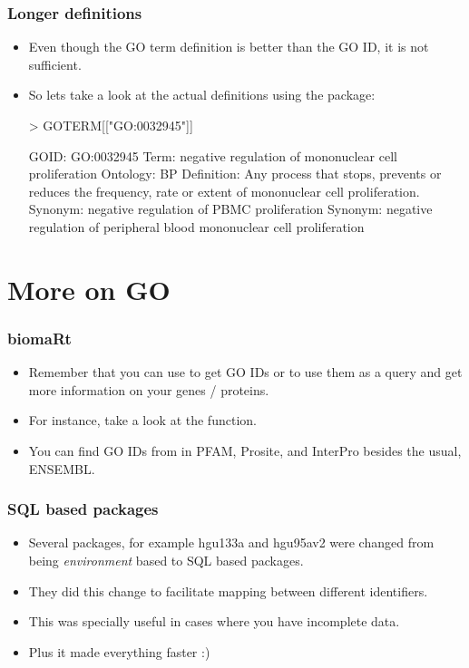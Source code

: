 \begin{frame}
  \frametitle{Longer definitions}
  \begin{itemize}
  \item Even though the GO term definition is better than the GO ID, it is not sufficient.
  \item So lets take a look at the actual definitions using the  package:
\begin{Schunk}
\begin{Sinput}
> GOTERM[["GO:0032945"]]
\end{Sinput}
\begin{Soutput}
GOID: GO:0032945
Term: negative regulation of
    mononuclear cell proliferation
Ontology: BP
Definition: Any process that stops,
    prevents or reduces the
    frequency, rate or extent of
    mononuclear cell proliferation.
Synonym: negative regulation of
    PBMC proliferation
Synonym: negative regulation of
    peripheral blood mononuclear
    cell proliferation
\end{Soutput}
\end{Schunk}
  \end{itemize}
\end{frame}

\section{More on GO}

\begin{frame}[allowframebreaks]
  \frametitle{biomaRt}
  \begin{itemize}
  \item Remember that you can use  to get GO IDs or to use them as a query and get more information on your genes / proteins.
  \item For instance, take a look at the  function.
  \item You can find GO IDs from  in PFAM, Prosite, and InterPro besides the usual, ENSEMBL.
  \end{itemize}
\end{frame}

\begin{frame}[allowframebreaks]
  \frametitle{SQL based packages}
  \begin{itemize}
  \item Several packages, for example hgu133a and hgu95av2 were changed from being \emph{environment} based to SQL based packages.
  \item They did this change to facilitate mapping between different identifiers.
  \item This was specially useful in cases where you have incomplete data.
  \item Plus it made everything faster :)
  \end{itemize}
\end{frame}

